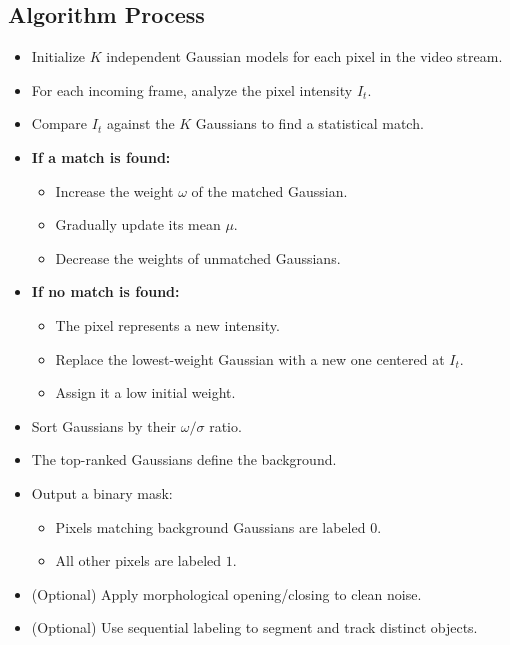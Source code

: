 \documentclass[12pt]{article}
\begin{document}
\subsection{Algorithm Process}

\begin{itemize}
    \item Initialize $K$ independent Gaussian models for each pixel in the video stream.

    \item For each incoming frame, analyze the pixel intensity $I_t$.

    \item Compare $I_t$ against the $K$ Gaussians to find a statistical match.

    \item \textbf{If a match is found:}
          \begin{itemize}
              \item Increase the weight $\omega$ of the matched Gaussian.
              \item Gradually update its mean $\mu$.
              \item Decrease the weights of unmatched Gaussians.
          \end{itemize}

    \item \textbf{If no match is found:}
          \begin{itemize}
              \item The pixel represents a new intensity.
              \item Replace the lowest-weight Gaussian with a new one centered at $I_t$.
              \item Assign it a low initial weight.
          \end{itemize}

    \item Sort Gaussians by their $\omega / \sigma$ ratio.

    \item The top-ranked Gaussians define the background.

    \item Output a binary mask:
          \begin{itemize}
              \item Pixels matching background Gaussians are labeled $0$.
              \item All other pixels are labeled $1$.
          \end{itemize}

    \item (Optional) Apply morphological opening/closing to clean noise.

    \item (Optional) Use sequential labeling to segment and track distinct objects.
\end{itemize}
\end{document}
